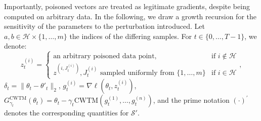 \documentclass[twoside,11pt]{article}
\newcommand\mc{\mathcal}
\begin{document}
    Importantly, poisoned vectors are treated as legitimate gradients, despite being computed on arbitrary data.
    In the following, we draw a growth recursion for the sensitivity of the parameters to the perturbation introduced. 
    Let $a, b \in \mc{H} \times \{1, \ldots, m\}$ the indices of the differing samples. For $t \in \{0, \ldots, T-1\}$, we denote: 
    \[
        z_t^{(i)} = 
        \begin{cases}
        \text{an arbitrary poisoned data point}, & \text{if } i \notin \mathcal{H} \\
        z^{(i, J_t^{(i)})}, J_t^{(i)} \text{ sampled uniformly from } \{1, \ldots, m\} & \text{if } i \in \mathcal{H}
        \end{cases},
    \]
    $\delta_{t} = \| \theta_{t} - \theta'_{t} \|_2$,
    $g^{(i)}_t = \nabla \ell (\theta_t, z_t^{(i)})$,
    $G^{\mathrm{CWTM}}_{\gamma_t}(\theta_t) = \theta_t - \gamma_t \mathrm{CWTM}(g^{(1)}_t, \ldots, g^{(n)}_t)$, 
    and the prime notation ${(\cdot)}^\prime$ denotes the corresponding quantities for $\mc{S}'$. 
\end{document}
